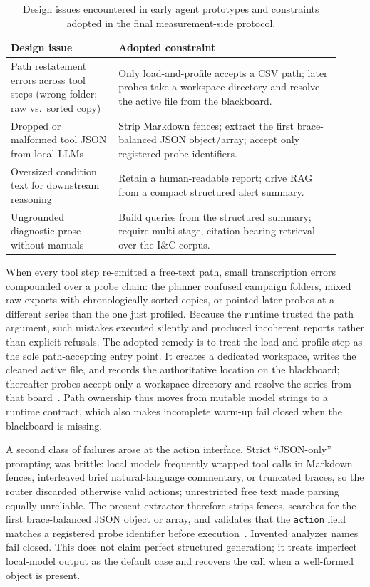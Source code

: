 \begin{table}[H]
  \centering
  \footnotesize
  \caption{Design issues encountered in early agent prototypes and constraints adopted in the final
  measurement-side protocol.}
  \label{tab:agent-design}
  \begin{tabular}{@{}p{0.30\linewidth}p{0.62\linewidth}@{}}
    \toprule
    Design issue & Adopted constraint \\
    \midrule
    Path restatement errors across tool steps
    (wrong folder; raw vs.\ sorted copy) &
    Only load-and-profile accepts a CSV path; later probes take a workspace directory and resolve the
    active file from the blackboard. \\
    Dropped or malformed tool JSON from local LLMs &
    Strip Markdown fences; extract the first brace-balanced JSON object/array; accept only registered
    probe identifiers. \\
    Oversized condition text for downstream reasoning &
    Retain a human-readable report; drive RAG from a compact structured alert summary. \\
    Ungrounded diagnostic prose without manuals &
    Build queries from the structured summary; require multi-stage, citation-bearing retrieval over the
    I\&C corpus. \\
    \bottomrule
  \end{tabular}
\end{table}

When every tool step re-emitted a free-text path, small transcription errors compounded over a probe
chain: the planner confused campaign folders, mixed raw exports with chronologically sorted copies, or
pointed later probes at a different series than the one just profiled.
Because the runtime trusted the path argument, such mistakes executed silently and produced incoherent
reports rather than explicit refusals.
The adopted remedy is to treat the load-and-profile step as the sole path-accepting entry point.
It creates a dedicated workspace, writes the cleaned active file, and records the authoritative
location on the blackboard; thereafter probes accept only a workspace directory and resolve the series
from that board~\citep{yao2023react,patil2024gorilla}.
Path ownership thus moves from mutable model strings to a runtime contract, which also makes incomplete
warm-up fail closed when the blackboard is missing.

A second class of failures arose at the action interface.
Strict ``JSON-only'' prompting was brittle: local models frequently wrapped tool calls in Markdown
fences, interleaved brief natural-language commentary, or truncated braces, so the router discarded
otherwise valid actions; unrestricted free text made parsing equally unreliable.
The present extractor therefore strips fences, searches for the first brace-balanced JSON object or
array, and validates that the \texttt{action} field matches a registered probe identifier before
execution~\citep{yao2023react,schick2023toolformer}.
Invented analyzer names fail closed.
This does not claim perfect structured generation; it treats imperfect local-model output as the
default case and recovers the call when a well-formed object is present.

